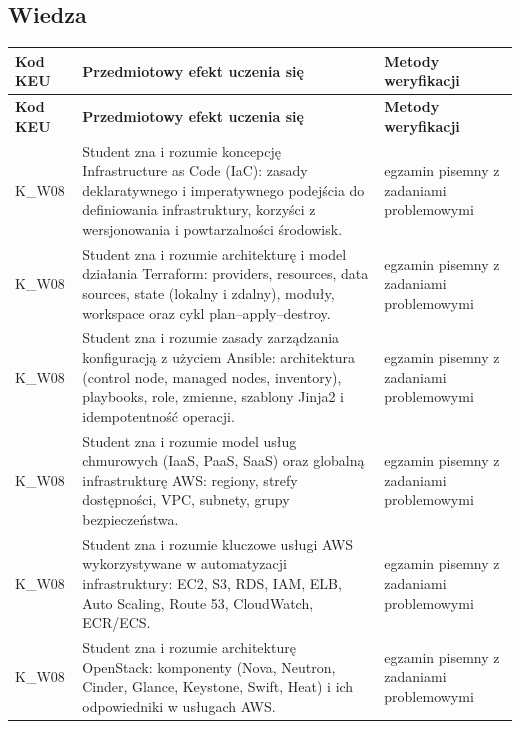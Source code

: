 \documentclass[12pt, a4paper]{article}
\newcommand{\thdrule}{\noalign{\global\setlength{\extrarowheight}{0pt}}}
\newcommand{\thdend}{\noalign{\global\setlength{\extrarowheight}{3pt}}}
\begin{document}
\subsection*{Wiedza}
{\scriptsize
\begin{longtable}{m{1.6cm}m{9.0cm}m{4.2cm}}
\thdrule\toprule
\rowcolor{pjatkRed} {\color{white}\footnotesize\textbf{\vphantom{Ag}Kod KEU}} & {\color{white}\footnotesize\textbf{\vphantom{Ag}Przedmiotowy efekt uczenia się}} & {\color{white}\footnotesize\textbf{\vphantom{Ag}Metody weryfikacji}} \\
\midrule\thdend
\endfirsthead
\thdrule\toprule
\rowcolor{pjatkRed} {\color{white}\footnotesize\textbf{\vphantom{Ag}Kod KEU}} & {\color{white}\footnotesize\textbf{\vphantom{Ag}Przedmiotowy efekt uczenia się}} & {\color{white}\footnotesize\textbf{\vphantom{Ag}Metody weryfikacji}} \\
\midrule\thdend
\endhead
  \rowcolor{tableRowLight} K\_W08 & Student zna i rozumie koncepcję Infrastructure as Code (IaC): zasady deklaratywnego i imperatywnego podejścia do definiowania infrastruktury, korzyści z wersjonowania i powtarzalności środowisk. & egzamin pisemny z zadaniami problemowymi \\
  \rowcolor{tableRowAlt} K\_W08 & Student zna i rozumie architekturę i model działania Terraform: providers, resources, data sources, state (lokalny i zdalny), moduły, workspace oraz cykl plan–apply–destroy. & egzamin pisemny z zadaniami problemowymi \\
  \rowcolor{tableRowLight} K\_W08 & Student zna i rozumie zasady zarządzania konfiguracją z użyciem Ansible: architektura (control node, managed nodes, inventory), playbooks, role, zmienne, szablony Jinja2 i idempotentność operacji. & egzamin pisemny z zadaniami problemowymi \\
  \rowcolor{tableRowAlt} K\_W08 & Student zna i rozumie model usług chmurowych (IaaS, PaaS, SaaS) oraz globalną infrastrukturę AWS: regiony, strefy dostępności, VPC, subnety, grupy bezpieczeństwa. & egzamin pisemny z zadaniami problemowymi \\
  \rowcolor{tableRowLight} K\_W08 & Student zna i rozumie kluczowe usługi AWS wykorzystywane w automatyzacji infrastruktury: EC2, S3, RDS, IAM, ELB, Auto Scaling, Route 53, CloudWatch, ECR/ECS. & egzamin pisemny z zadaniami problemowymi \\
  \rowcolor{tableRowAlt} K\_W08 & Student zna i rozumie architekturę OpenStack: komponenty (Nova, Neutron, Cinder, Glance, Keystone, Swift, Heat) i ich odpowiedniki w usługach AWS. & egzamin pisemny z zadaniami problemowymi \\

\end{longtable}}
\end{document}
